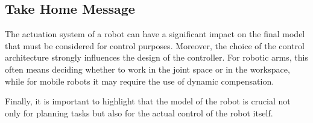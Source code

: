 \hfill

\subsection*{Take Home Message}

The actuation system of a robot can have a significant impact on the final model that must be considered for control purposes.  
Moreover, the choice of the control architecture strongly influences the design of the controller. For robotic arms, this often means deciding whether to work in the joint space or in the workspace, while for mobile robots it may require the use of dynamic compensation.  

Finally, it is important to highlight that the model of the robot is crucial not only for planning tasks but also for the actual control of the robot itself.

